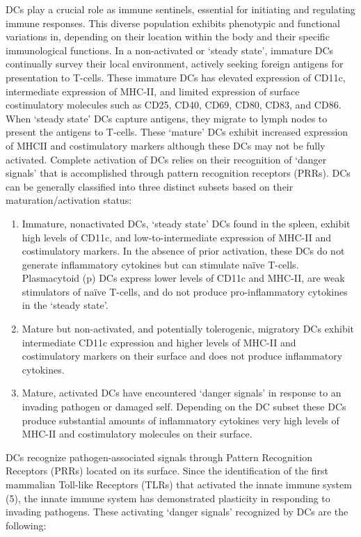 \documentclass[
]{article}
\begin{document}
DCs play a crucial role as immune sentinels, essential for initiating
and regulating immune responses. This diverse population exhibits
phenotypic and functional variations in, depending on their location
within the body and their specific immunological functions. In a
non-activated or `steady state', immature DCs continually survey their
local environment, actively seeking foreign antigens for presentation to
T-cells. These immature DCs has elevated expression of CD11c,
intermediate expression of MHC-II, and limited expression of surface
costimulatory molecules such as CD25, CD40, CD69, CD80, CD83, and CD86.
When `steady state' DCs capture antigens, they migrate to lymph nodes to
present the antigens to T-cells. These `mature' DCs exhibit increased
expression of MHCII and costimulatory markers although these DCs may not
be fully activated. Complete activation of DCs relies on their
recognition of `danger signals' that is accomplished through pattern
recognition receptors (PRRs). DCs can be generally classified into three
distinct subsets based on their maturation/activation status:

\begin{enumerate}
\def\labelenumi{\arabic{enumi}.}
\item
  Immature, nonactivated DCs, `steady state' DCs found in the spleen,
  exhibit high levels of CD11c, and low-to-intermediate expression of
  MHC-II and costimulatory markers. In the absence of prior activation,
  these DCs do not generate inflammatory cytokines but can stimulate
  naïve T-cells. Plasmacytoid (p) DCs express lower levels of CD11c and
  MHC-II, are weak stimulators of naïve T-cells, and do not produce
  pro-inflammatory cytokines in the `steady state'.
\item
  Mature but non-activated, and potentially tolerogenic, migratory DCs
  exhibit intermediate CD11c expression and higher levels of MHC-II and
  costimulatory markers on their surface and does not produce
  inflammatory cytokines.
\item
  Mature, activated DCs have encountered `danger signals' in response to
  an invading pathogen or damaged self. Depending on the DC subset these
  DCs produce substantial amounts of inflammatory cytokines very high
  levels of MHC-II and costimulatory molecules on their surface.
\end{enumerate}

DCs recognize pathogen-associated signals through Pattern Recognition
Receptors (PRRs) located on its surface. Since the identification of the
first mammalian Toll-like Receptors (TLRs) that activated the innate
immune system (5), the innate immune system has demonstrated plasticity
in responding to invading pathogens. These activating `danger signals'
recognized by DCs are the following:
\end{document}
